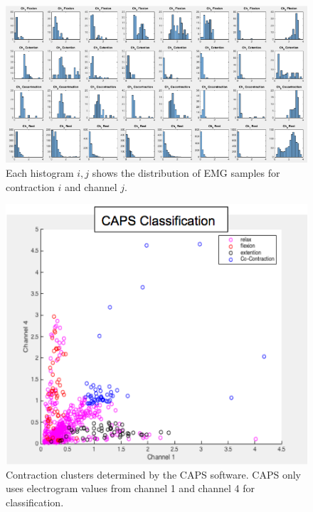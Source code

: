 \documentclass[times, 10pt,twocolumn]{article}
\begin{document}
\begin{figure}[h]
  \includegraphics[width=\linewidth]{Figures/f2.png}
  \caption{Each histogram ${i,j}$ shows the distribution of EMG samples for contraction $i$ and channel $j$.}
  \label{histogram}
\end{figure}

\begin{figure}[h]
  \includegraphics[width=\linewidth]{Figures/f3.png}
  \caption{Contraction clusters determined by the CAPS software. CAPS only uses electrogram values from channel 1 and channel 4 for classification.}
  \label{caps_clusters}
\end{figure}
\end{document}
